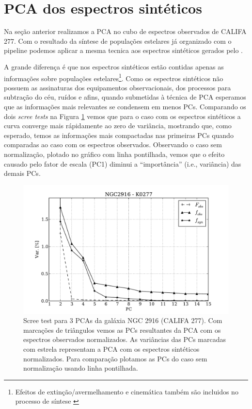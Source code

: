 \section{PCA dos espectros sintéticos}
\label{sec:PCAaplic:OBSxSYN}

Na seção anterior realizamos a PCA no cubo de espectros observados de CALIFA 277. Com o resultado da síntese de
populações estelares já organizado com o pipeline \pycasso podemos aplicar a mesma tecnica aos espectros sintéticos
gerados pelo \starlight.

A grande diferença é que nos espectros sintéticos estão contidas apenas as informações sobre populações
estelares\footnote{Efeitos de extinção/avermelhamento e cinemática também são incluidos no processo de síntese
\citep{CidFernandes2005}}. Como os espectros sintéticos não possuem as assinaturas dos equipamentos observacionais, dos
processos para subtração do céu, ruídos e afins, quando submetidas à técnica de PCA esperamos que as informações mais
relevantes se condensem em menos PCs. Comparando os dois {\em scree tests} na Figura \ref{fig:K0277scree} vemos que para
o caso com os espectros sintéticos a curva converge mais rápidamente ao zero de variância, mostrando que, como esperado,
temos as informações mais compactadas nas primeiras PCs quando comparadas ao caso com os espectros observados.
Observando o caso sem normalização, plotado no gráfico com linha pontilhada, vemos que o efeito causado pelo fator de
escala (PC1) diminui a ``importância'' (i.e., variância) das demais PCs.

\begin{figure}
    \includegraphics[width=1.\textwidth]{figuras/K0277-screetest.pdf}
    \caption[Scree test comparativo entre 3 PCAs.]
    {Scree test para 3 PCAs da galáxia NGC 2916 (CALIFA 277). Com marcações de triângulos vemos as PCs resultantes
    da PCA com os espectros observados normalizados. As variâncias das PCs marcadas com estrela representam a PCA com
    os espectros sintéticos normalizados. Para comparação plotamos as PCs do caso sem normalização usando linha pontilhada.}
    \label{fig:K0277scree}
\end{figure}

